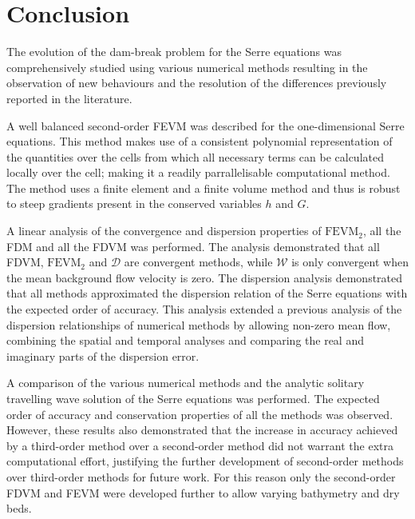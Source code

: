 
\chapter{Conclusion}
\label{chp:Conclusion}



The evolution of the dam-break problem for the Serre equations was comprehensively studied using various numerical methods resulting in the observation of new behaviours and the resolution of the differences previously reported in the literature.  

A well balanced second-order FEVM was described for the one-dimensional Serre equations. This method makes use of a consistent polynomial representation of the quantities over the cells from which all necessary terms can be calculated locally over the cell; making it a readily parrallelisable computational method. The method uses a finite element and a finite volume method and thus is robust to steep gradients present in the conserved variables $h$ and $G$. 

A linear analysis of the convergence and dispersion properties of $\text{FEVM}_2$, all the FDM and all the FDVM \cite{Pitt-2018-61} was performed. The analysis demonstrated that all FDVM, $\text{FEVM}_2$ and $\mathcal{D}$ are convergent methods, while $\mathcal{W}$ is only convergent when the mean background flow velocity is zero. The dispersion analysis demonstrated that all methods approximated the dispersion relation of the Serre equations with the expected order of accuracy. This analysis extended a previous analysis of the dispersion relationships of numerical methods \cite{Filippini-etal-2016-381} by allowing non-zero mean flow, combining the spatial and temporal analyses and comparing the real and imaginary parts of the dispersion error. 

A comparison of the various numerical methods and the analytic solitary travelling wave solution of the Serre equations was performed. The expected order of accuracy and conservation properties of all the methods was observed. However, these results also demonstrated that the increase in accuracy achieved by a third-order method over a second-order method did not warrant the extra computational effort, justifying the further development of second-order methods over third-order methods for future work. For this reason only the second-order FDVM and FEVM were developed further to allow varying bathymetry and dry beds.

